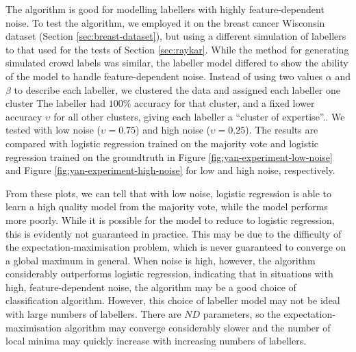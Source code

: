         The \citeauthor{yan10} algorithm is good for modelling labellers with
        highly feature-dependent noise. To test the algorithm, we employed it on
        the breast cancer Wisconsin dataset (Section \ref{sec:breast-dataset}),
        but using a different simulation of labellers to that used for the
        \citeauthor{raykar10} tests of Section \ref{sec:raykar}. While the
        method for generating simulated crowd labels was similar, the labeller
        model differed to show the ability of the \citeauthor{yan10} model to
        handle feature-dependent noise. Instead of using two values $\alpha$ and
        $\beta$ to describe each labeller, we clustered the data and assigned
        each labeller one cluster The labeller had $100\%$ accuracy for that
        cluster, and a fixed lower accuracy $\upsilon$ for all other clusters,
        giving each labeller a ``cluster of expertise''.. We tested with low
        noise ($\upsilon = 0.75$) and high noise ($\upsilon = 0.25$). The
        results are compared with logistic regression trained on the majority
        vote and logistic regression trained on the groundtruth in Figure
        \ref{fig:yan-experiment-low-noise} and Figure
        \ref{fig:yan-experiment-high-noise} for low and high noise,
        respectively.

        From these plots, we can tell that with low noise, logistic regression
        is able to learn a high quality model from the majority vote, while the
        \citeauthor{yan10} model performs more poorly. While it is possible for
        the \citeauthor{yan10} model to reduce to logistic regression, this is
        evidently not guaranteed in practice. This may be due to the difficulty
        of the expectation-maximisation problem, which is never guaranteed to
        converge on a global maximum in general. When noise is high, however,
        the \citeauthor{yan10} algorithm considerably outperforms logistic
        regression, indicating that in situations with high, feature-dependent
        noise, the \citeauthor{yan10} algorithm may be a good choice of
        classification algorithm. However, this choice of labeller model may not
        be ideal with large numbers of labellers. There are $ND$ parameters, so
        the expectation-maximisation algorithm may converge considerably slower
        and the number of local minima may quickly increase with increasing
        numbers of labellers.
